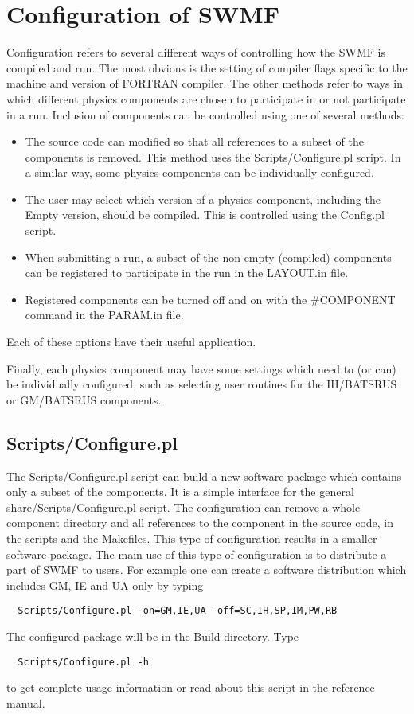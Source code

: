 \section{Configuration of SWMF}

Configuration refers to several different ways of controlling how the 
SWMF is compiled and run.  The most obvious is the setting of
compiler flags specific to the machine and version of FORTRAN
compiler.  The other methods refer to ways in which different physics
components are chosen to participate in or not participate in a run.
Inclusion of components can be controlled using one of several methods:

\begin{itemize}
\item The source code can modified so that all references %
      to a subset of the components is removed. %
      This method uses the Scripts/Configure.pl script. %
      In a similar way, some physics components can be individually
      configured.
\item The user may select which version of a physics component,
      including the Empty version,
      should be compiled.  This is controlled using the Config.pl script.
\item When submitting a run, a subset of the non-empty (compiled) 
      components can be
      registered to participate in the run in the LAYOUT.in file.
\item Registered components can be turned off and on with the \#COMPONENT
      command in the PARAM.in file.
\end{itemize}
Each of these options have their useful application.

Finally, each physics component may have some settings which need to
(or can) be individually
configured, such as selecting user routines for the IH/BATSRUS or
GM/BATSRUS components.

\subsection{Scripts/Configure.pl}

The Scripts/Configure.pl script can build a new software package which
contains only a subset of the components. It is a simple interface
for the general share/Scripts/Configure.pl script. The configuration
can remove a whole component directory and all references to the component 
in the source code, in the scripts and the Makefiles.
This type of configuration results in a smaller software package.
The main use of this type of configuration is to distribute
a part of SWMF to users. For example one can create a 
software distribution which includes GM, IE and UA only by typing
\begin{verbatim}
  Scripts/Configure.pl -on=GM,IE,UA -off=SC,IH,SP,IM,PW,RB
\end{verbatim}
The configured package will be in the Build directory.  Type
\begin{verbatim}
  Scripts/Configure.pl -h
\end{verbatim}
to get complete usage information or read about this script 
in the reference manual.

